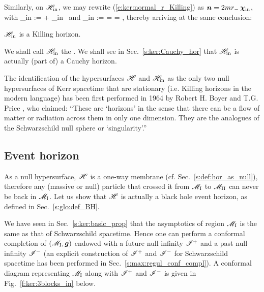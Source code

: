 Similarly, on $\mathscr{H}_{\rm in}$, we may rewrite (\ref{e:ker:normal_r_Killing})
as $\bm{n} = 2 m r_- \, \bm{\chi}_{\rm in}$, with
\be \label{e:ker:def_chi_in}
    \w{\chi}_{\rm in} := \w{\xi} + \Omega_{\rm in} \, \w{\eta}
\ee
and
\be \label{e:ker:def_Omega_in}
    \Omega_{\rm in} :=  = 
        =  ,
\ee
thereby arriving at the same conclusion:
\begin{greybox}
$\mathscr{H}_{\rm in}$ is a Killing horizon.
\end{greybox}
We shall call $\mathscr{H}_{\rm in}$ the . We shall see in Sec.~\ref{s:ker:Cauchy_hor} that $\mathscr{H}_{\rm in}$
is actually (part of) a Cauchy horizon.

\begin{hist}
The identification of the hypersurfaces $\mathscr{H}$ and $\mathscr{H}_{\rm in}$
as the only two null hypersurfaces of Kerr spacetime that are stationary
(i.e. Killing horizons in the modern language) has been first performed in
1964 by Robert H. Boyer
and T.G. Price \cite{BoyerP65}, who claimed: ``These are `horizons'
in the sense that there can be a flow of matter or radiation across them in only one dimension. They are the analogues of the Schwarzschild null sphere or `singularity'.''
\end{hist}

\subsection{Event horizon}

As a null hypersurface, $\mathscr{H}$ is a one-way membrane (cf. Sec.~\ref{s:def:hor_as_null}),
therefore any (massive or null) particle that crossed it from $\mathscr{M}_{\rm I}$ to
$\mathscr{M}_{\rm II}$ can never be back in $\mathscr{M}_{\rm I}$. Let us show that $\mathscr{H}$
is actually a black hole event horizon, as defined in Sec.~\ref{s:glo:def_BH}.

We have seen in Sec.~\ref{s:ker:basic_prop} that the asymptotics of region $\mathscr{M}_{\rm I}$
is the same as that of Schwarzschild spacetime. Hence one can perform a conformal
completion of $(\mathscr{M}_{\rm I},\bm{g})$ endowed with a future null infinity $\mathscr{I}^+$
and a past null infinity $\mathscr{I}^-$ (an explicit construction of $\mathscr{I}^+$ and
$\mathscr{I}^-$ for Schwarzschild spacetime has been performed in
Sec.~\ref{s:max:regul_conf_compl}). A conformal diagram representing $\mathscr{M}_{\rm I}$
along with $\mathscr{I}^+$
and $\mathscr{I}^-$ is given in Fig.~\ref{f:ker:3blocks_in} below.


